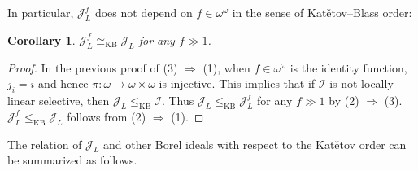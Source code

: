 \documentclass[a4paper,12pt]{amsart}
\newtheorem{cor}[thm]{Corollary}
\theoremstyle{definition}
\numberwithin{thm}{section}
\numberwithin{equation}{section}
\newcommand{\oo}{{\omega}^\omega}
\newcommand{\I}{\mathscr{I}}
\newcommand{\J}{\mathscr{J}}
\begin{document}
    In particular, $\J_L^f$ does not depend on $f\in\oo$ in the sense of  Kat\v{e}tov--Blass order:

    \begin{cor}\label{cor:JL_KB_eq}
        $\J_L^f\cong_{\mathrm{KB}}\J_L$ for any $f\gg1$.
    \end{cor}
    \begin{proof}
        In the previous proof of (3) $\Rightarrow$ (1), when $f\in\oo$ is the identity function, $j_i=i$ and hence $\pi\colon\omega\to\omega\times\omega$ is injective. This implies that if $\I$ is not locally linear selective, then $\J_L \leq_{\mathrm{KB}} \I$. Thus $\J_L \leq_{\mathrm{KB}} \J_L^f$ for any $f\gg1$ by (2) $\Rightarrow$ (3). $\J_L^f \leq_{\mathrm{KB}} \J_L$ follows from (2) $\Rightarrow$ (1).
     \end{proof} 

    The relation of $\J_L$ and other Borel ideals with respect to the Kat\v{e}tov order can be summarized as follows.
    
\end{document}

